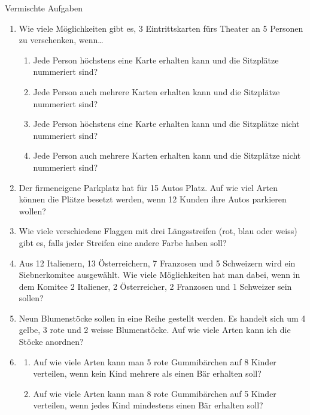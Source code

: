 \begin{ueb}
    {Vermischte Aufgaben}{}
    \begin{enumerate}

        \item Wie viele Möglichkeiten gibt es, 3 Eintrittskarten fürs Theater an 5 Personen zu verschenken, wenn\dots
              \begin{enumerate}
                  \item Jede Person höchstens eine Karte erhalten kann und die Sitzplätze nummeriert sind?
                  \item Jede Person auch mehrere Karten erhalten kann und die Sitzplätze nummeriert sind?
                  \item Jede Person höchstens eine Karte erhalten kann und die Sitzplätze nicht nummeriert sind?
                  \item Jede Person auch mehrere Karten erhalten kann und die Sitzplätze nicht nummeriert sind?
              \end{enumerate}

        \item Der firmeneigene Parkplatz hat für 15 Autos Platz. Auf wie viel Arten können die Plätze besetzt werden, wenn 12 Kunden ihre Autos parkieren wollen?

        \item Wie viele verschiedene Flaggen mit drei Längsstreifen (rot, blau oder weiss) gibt es, falls jeder Streifen eine andere Farbe haben soll?


        \item Aus 12 Italienern, 13 Österreichern, 7 Franzosen und 5 Schweizern wird ein Siebnerkomitee ausgewählt. Wie viele Möglichkeiten hat man dabei, wenn in dem Komitee 2 Italiener, 2 Österreicher, 2 Franzosen und 1 Schweizer sein sollen?

        \item Neun Blumenstöcke sollen in eine Reihe gestellt werden. Es handelt sich um 4 gelbe, 3 rote und 2 weisse Blumenstöcke. Auf wie viele Arten kann ich die Stöcke anordnen?

        \item
              \begin{enumerate}
                  \item Auf wie viele Arten kann man 5 rote Gummibärchen auf 8 Kinder verteilen, wenn kein Kind mehrere als einen Bär erhalten soll?
                  \item Auf wie viele Arten kann man 8 rote Gummibärchen auf 5 Kinder verteilen, wenn jedes Kind mindestens einen Bär erhalten soll?
              \end{enumerate}



\end{enumerate}
\end{ueb}

